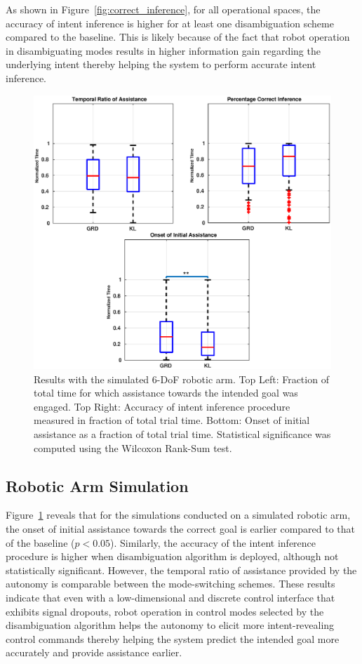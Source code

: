 \documentclass[letterpaper, 10 pt, conference]{ieeeconf}  %
\begin{document}
As shown in Figure~\ref{fig:correct_inference}, for all operational spaces, the accuracy of intent inference is higher for at least one disambiguation scheme compared to the baseline. This is likely because of the fact that robot operation in disambiguating modes results in higher information gain regarding the underlying intent thereby helping the system to perform accurate intent inference.
\begin{figure}[t]
	\centering
	\includegraphics[width= 1.\hsize, height=0.24\vsize, center]{./figures/mico_sim_new.eps}
	\vspace{-0.5cm}
	\caption{Results with the simulated 6-DoF robotic arm. Top Left: Fraction of total time for which assistance towards the intended goal was engaged. Top Right: Accuracy of intent inference procedure measured in fraction of total trial time. Bottom: Onset of initial assistance as a fraction of total trial time. Statistical significance was computed using the Wilcoxon Rank-Sum test. } 
	\label{fig:mico_results}
\end{figure}
\subsection{Robotic Arm Simulation}
Figure~\ref{fig:mico_results} reveals that for the simulations conducted on a simulated robotic arm, the onset of initial assistance towards the correct goal is earlier compared to that of the baseline ($p < 0.05$). Similarly, the accuracy of the intent inference procedure is higher when disambiguation algorithm is deployed, although not statistically significant. However, the temporal ratio of assistance provided by the autonomy is comparable between the mode-switching schemes. These results indicate that even with a low-dimensional and discrete control interface that exhibits signal dropouts, robot operation in control modes selected by the disambiguation algorithm helps the autonomy to elicit more intent-revealing control commands thereby helping the system predict the intended goal more accurately and provide assistance earlier. 
\end{document}
